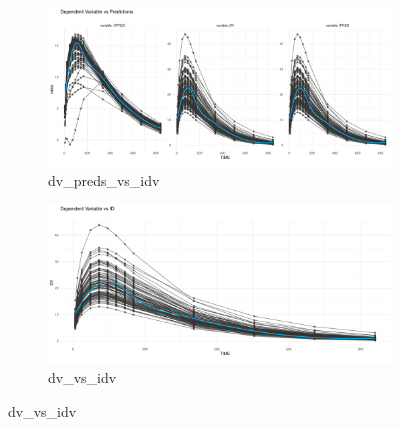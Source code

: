 \begin{figure}[htbp]
    \begin{subfigure}[b]{0.45\linewidth}
        \centering
        \includegraphics[width=\linewidth]{fig/img/Xpose/dv_preds_vs_idv.pdf}
        \caption{dv\_preds\_vs\_idv}
        \label{fig:dv_preds_vs_idv}
    \end{subfigure}
    \hfill
    \begin{subfigure}[b]{0.45\linewidth}
        \centering
        \includegraphics[width=\linewidth]{fig/img/Xpose/dv_vs_idv.pdf}
        \caption{dv\_vs\_idv}
        \label{fig:dv_vs_idv}
    \end{subfigure}

    \vspace{1em}


\end{figure}
